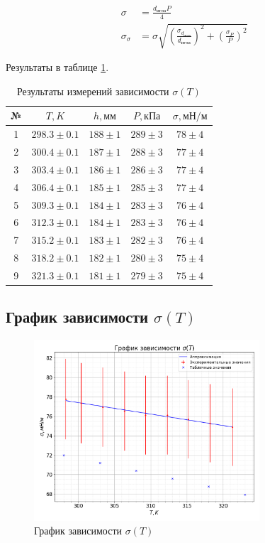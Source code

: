 \documentclass[a4paper, 12pt]{article}
\begin{document}
			\begin{align*}
				\sigma &= \frac{d_{игла} P}{4}\\
				\sigma_{\sigma} &= \sigma \sqrt{ \left( \frac{\sigma_{d_{игла}}}{d_{игла}} \right)^2 + \left( \frac{\sigma_P}{P} \right)^2}
			\end{align*}

			Результаты в таблице \ref{tab:sigma_T}.

			\begin{table}[!ht]
				\centering
				\begin{tabular}{|c|c|c|c|c|}
					\hline

					№ & $T, K$ & $h, мм$ & $P, кПа$ & $\sigma, мН/м$\\ \hline
					1 & $298.3 \pm 0.1$ & $188 \pm 1$ & $289 \pm 3$ & $78 \pm 4$\\ \hline
					2 & $300.4 \pm 0.1$ & $187 \pm 1$ & $288 \pm 3$ & $77 \pm 4$\\ \hline
					3 & $303.4 \pm 0.1$ & $186 \pm 1$ & $286 \pm 3$ & $77 \pm 4$\\ \hline
					4 & $306.4 \pm 0.1$ & $185 \pm 1$ & $285 \pm 3$ & $77 \pm 4$\\ \hline
					5 & $309.3 \pm 0.1$ & $184 \pm 1$ & $283 \pm 3$ & $76 \pm 4$\\ \hline
					6 & $312.3 \pm 0.1$ & $184 \pm 1$ & $283 \pm 3$ & $76 \pm 4$\\ \hline
					7 & $315.2 \pm 0.1$ & $183 \pm 1$ & $282 \pm 3$ & $76 \pm 4$\\ \hline
					8 & $318.2 \pm 0.1$ & $182 \pm 1$ & $280 \pm 3$ & $75 \pm 4$\\ \hline
					9 & $321.3 \pm 0.1$ & $181 \pm 1$ & $279 \pm 3$ & $75 \pm 4$\\ \hline

				\end{tabular}
				\caption{Результаты измерений зависимости $\sigma(T)$}
				\label{tab:sigma_T}
			\end{table}

		\subsection{График зависимости $\sigma(T)$}

			\begin{figure}[!ht]
				\centering
				\includegraphics[width=0.75\textwidth]{graph/sigma_T_plot.png}
				\caption{График зависимости $\sigma(T)$}
				\label{plot:dsigma_div_dT}
			\end{figure}
\end{document}
